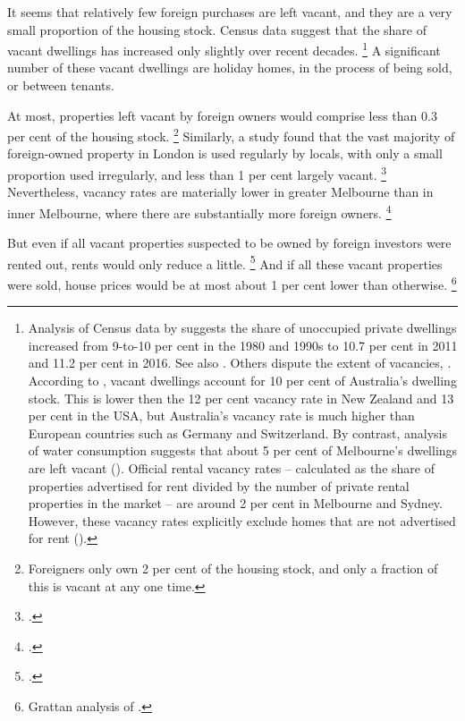 It seems that relatively few foreign purchases are left vacant, and they are a very small proportion of the housing stock. Census data suggest that the share of vacant dwellings has increased only slightly over recent decades.%
    \footnote{Analysis of Census data by \textcite{SGSCensus2017} suggests the share of unoccupied private dwellings increased from 9-to-10 per cent in the 1980 and 1990s to 10.7 per cent in 2011 and 11.2 per cent in 2016.
	See also \textcite{Pawson-2017-theConvo-Taxing-empty-homes}.
	Others dispute the extent of vacancies, \textcite{ACIL2017Property}. According to \textcite{OECD2017housingdatabase}, vacant dwellings account for 10 per cent of Australia's dwelling stock. This is lower then the 12 per cent vacancy rate in New Zealand and 13 per cent in the USA, but Australia's vacancy rate is much higher than European countries such as Germany and Switzerland.
	By contrast, analysis of water consumption suggests that about 5 per cent of Melbourne's dwellings are left vacant (\textcite{CashmoreSpecVac}). Official rental vacancy rates -- calculated as the share of properties advertised for rent divided by the number of private rental properties in the market -- are around 2 per cent in Melbourne and Sydney.  However, these vacancy rates explicitly exclude homes that are not advertised for rent (\textcites{RENSW-vacancy-rate-2018}{REIV-vacancy-rate-2018}).}
A significant number of these vacant dwellings are holiday homes, in the process of being sold, or between tenants.

At most, properties left vacant by foreign owners would comprise less than 0.3 per cent of the housing stock.%
    \footnote{Foreigners only own 2 per cent of the housing stock, and only a fraction of this is vacant at any one time.}
Similarly, a study found that the vast majority of foreign-owned property in London is used regularly by locals, with only a small proportion used irregularly, and less than 1 per cent largely vacant.%
    \footcite{ScanlonLondon}
Nevertheless, vacancy rates are materially lower in greater Melbourne than in inner Melbourne, where there are substantially more foreign owners.%
    \footcite{SGSCensus2017}

But even if all vacant properties suspected to be owned by foreign investors were rented out, rents would only reduce a little.%
	\footcite{Murray2017a}
And if all these vacant properties were sold, house prices would be at most about 1 per cent lower than otherwise.%
	\footnote{Grattan analysis of \textcite{Abelson-and-Chung-2005-realstoryofhousingprices}.}

